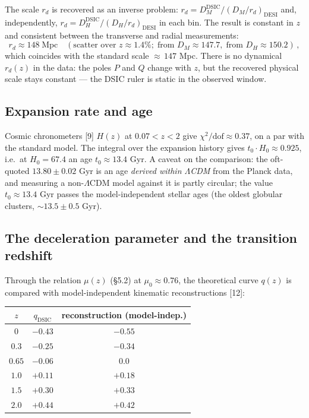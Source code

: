 \documentclass{article}
\begin{document}
The scale $r_d$ is recovered as an inverse problem: $r_d = D_M^{\text{DSIC}}/(D_M/r_d)_{\text{DESI}}$ and, independently, $r_d = D_H^{\text{DSIC}}/(D_H/r_d)_{\text{DESI}}$ in each bin. The result is constant in $z$ and consistent between the transverse and radial measurements:
\begin{equation*}
r_d \approx 148\;\text{Mpc} \quad (\text{scatter over } z \approx 1.4\%;\; \text{from } D_M \approx 147.7,\; \text{from } D_H \approx 150.2)\,,
\end{equation*}
which coincides with the standard scale ${\approx}\,147$ Mpc. There is no dynamical $r_d(z)$ in the data: the poles $P$ and $Q$ change with $z$, but the recovered physical scale stays constant --- the DSIC ruler is static in the observed window.

\subsection{Expansion rate and age}

Cosmic chronometers [9] $H(z)$ at $0.07 < z < 2$ give $\chi^2/\text{dof} \approx 0.37$, on a par with the standard model. The integral over the expansion history gives $t_0\cdot H_0 \approx 0.925$, i.e.\ at $H_0 = 67.4$ an age $t_0 \approx 13.4$ Gyr. A caveat on the comparison: the oft-quoted $13.80 \pm 0.02$ Gyr is an age \textit{derived within $\Lambda$CDM} from the Planck data, and measuring a non-$\Lambda$CDM model against it is partly circular; the value $t_0 \approx 13.4$ Gyr passes the model-independent stellar ages (the oldest globular clusters, ${\sim}13.5 \pm 0.5$ Gyr).

\subsection{The deceleration parameter and the transition redshift}

Through the relation $\mu(z)$ (\S5.2) at $\mu_0 \approx 0.76$, the theoretical curve $q(z)$ is compared with model-independent kinematic reconstructions [12]:

\begin{table}[htbp]
\centering
\small
\begin{tabular}{@{}ccc@{}}
\toprule
$z$ & $q_{\text{DSIC}}$ & \textbf{reconstruction (model-indep.)} \\
\midrule
$0$ & $-0.43$ & $-0.55$ \\
$0.3$ & $-0.25$ & $-0.34$ \\
$0.65$ & $-0.06$ & $0.0$ \\
$1.0$ & $+0.11$ & $+0.18$ \\
$1.5$ & $+0.30$ & $+0.33$ \\
$2.0$ & $+0.44$ & $+0.42$ \\
\bottomrule
\end{tabular}
\end{table}
\end{document}
